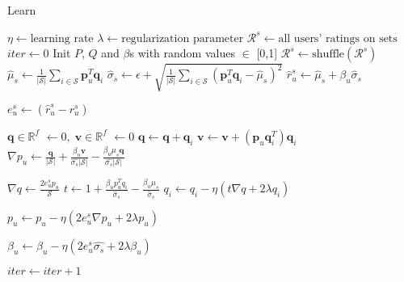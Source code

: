 \begin{algorithm}
  \caption{Learn \VO}
  \label{alg:alg-lfs-voarm}
  \begin{algorithmic}[1]
    \State $\eta \gets  \text{learning rate}$
    \State $\lambda \gets \text{regularization parameter}$
    \State $\mathcal{R}^s \gets \text{all users' ratings on sets}$  
    \State $iter \gets 0$
    \State Init $P$, $Q$ and $\beta$s with random values $\in$ [0,1]
      \State $\mathcal{R}^s \gets \text{shuffle}(\mathcal{R}^s)$
        \State $\hat{\mu}_s \gets  \frac{1}{|\mathcal{S}|} \sum_{i \in \mathcal{S}} \bm{p}_u^T\bm{q}_i$ 
        \State $\hat{\sigma}_s \gets  \epsilon + \sqrt{\frac{1}{|\mathcal{S}|} \sum_{i \in
          \mathcal{S}}  (\bm{p}_u^T\bm{q}_i - \hat{\mu}_s)^2}$
          \State $\hat{r}_u^s \gets \hat{\mu}_s + \beta_u \hat{\sigma}_s$

        \State $e_{u}^s \gets (\hat{r}_{u}^s - r_{u}^s)$
        

        \State $\bm{q} \in \mathbb{R}^f$  $\gets 0, \;\bm{v} \in \mathbb{R}^f$  $\gets 0$
          \State $\bm{q} \gets \bm{q} + \bm{q}_i$
          \State $\bm{v} \gets \bm{v} + (\bm{p}_u\bm{q}_i^T)\bm{q}_i$
        \EndFor
        \State $\nabla p_u \gets \frac{\bm{q}}{|\mathcal{S}|} 
          + \frac{\beta_u \bm{v}}{\hat{\sigma_s}|\mathcal{S}|}
          - \frac{\beta_u \mu_s \bm{q}}{\hat{\sigma_s} |\mathcal{S}|}$


        \State $\nabla q \gets \frac{2e_{u}^s p_u}{\mathcal{S}}$
          \State $t \gets 1 + \frac{\beta_u p_u^Tq_i}{\hat{\sigma}_s} 
            - \frac{\beta_u \mu_s}{\hat{\sigma}_s}  $
            \State $q_i \gets q_i - \eta(t \nabla q + 2\lambda q_i)$
        \EndFor

        \State $p_u \gets p_u - \eta(2 e_{u}^s \nabla p_u + 2 \lambda p_u )$
        
        \State $\beta_u \gets \beta_u - \eta(2 e_{u}^s \hat{\sigma_s} +
        2\lambda\beta_u)$ 

      \EndFor
      \State $iter \gets iter + 1$
    \EndWhile
    \EndProcedure
  \end{algorithmic}
\end{algorithm}



